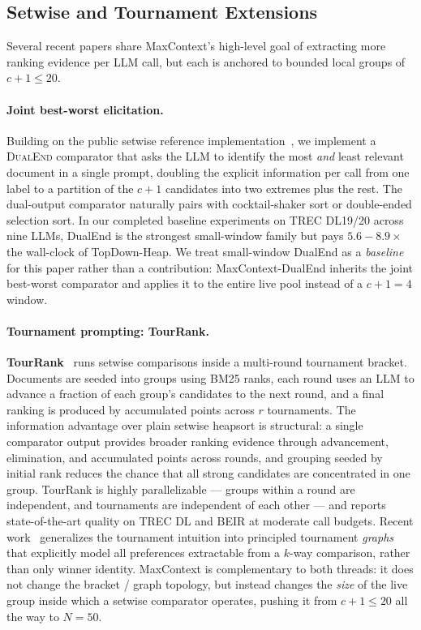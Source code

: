 \subsection{Setwise and Tournament Extensions}
\label{ssec:rw_extensions}

Several recent papers share MaxContext's high-level goal of extracting more
ranking evidence per LLM call, but each is anchored to bounded local groups
of $c{+}1{\le}20$.

\paragraph{Joint best-worst elicitation.}
Building on the public setwise reference
implementation~\citep{ielab_llmrankers}, we implement a \textsc{DualEnd}
comparator that asks the LLM to identify the most \emph{and} least relevant
document in a single prompt, doubling the explicit information per call from
one label to a partition of the $c{+}1$ candidates into two extremes plus
the rest. The dual-output comparator naturally pairs with cocktail-shaker
sort or double-ended selection sort. In our completed baseline experiments
on TREC DL19/20 across nine LLMs, DualEnd is the strongest small-window
family but pays $5.6{-}8.9\times$ the wall-clock of TopDown-Heap. We treat
small-window DualEnd as a \emph{baseline} for this paper rather than a
contribution: MaxContext-DualEnd inherits the joint best-worst comparator
and applies it to the entire live pool instead of a $c{+}1{=}4$ window.

\paragraph{Tournament prompting: TourRank.}
\textbf{TourRank}~\citep{chen2025tourrank} runs setwise comparisons inside a
multi-round tournament bracket. Documents are seeded into groups using BM25
ranks, each round uses an LLM to advance a fraction of each group's
candidates to the next round, and a final ranking is produced by accumulated
points across $r$ tournaments. The information advantage over plain setwise
heapsort is structural: a single comparator output provides broader ranking
evidence through advancement, elimination, and accumulated points across
rounds, and grouping seeded by initial rank reduces the chance that all
strong candidates are concentrated in one group. TourRank is highly
parallelizable --- groups within a round are independent, and tournaments
are independent of each other --- and reports state-of-the-art quality on
TREC DL and BEIR at moderate call budgets. Recent
work~\citep{blitzrank2026} generalizes the tournament intuition into
principled tournament \emph{graphs} that explicitly model all preferences
extractable from a $k$-way comparison, rather than only winner identity.
MaxContext is complementary to both threads: it does not change the bracket
/ graph topology, but instead changes the \emph{size} of the live group
inside which a setwise comparator operates, pushing it from $c{+}1{\le}20$
all the way to $N{=}50$.

